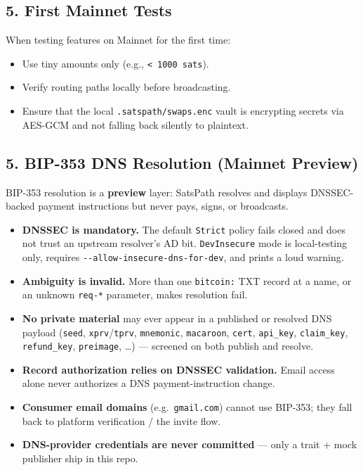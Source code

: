 \documentclass[
]{article}
\providecommand{\tightlist}{%
  \setlength{\itemsep}{0pt}\setlength{\parskip}{0pt}}
\begin{document}
\hypertarget{first-mainnet-tests}{%
\subsection{5. First Mainnet Tests}\label{first-mainnet-tests}}

When testing features on Mainnet for the first time:

\begin{itemize}
\tightlist
\item
  Use tiny amounts only (e.g., \texttt{\textless{}\ 1000\ sats}).
\item
  Verify routing paths locally before broadcasting.
\item
  Ensure that the local \texttt{.satspath/swaps.enc} vault is encrypting
  secrets via AES-GCM and not falling back silently to plaintext.
\end{itemize}

\hypertarget{bip-353-dns-resolution-mainnet-preview}{%
\subsection{5. BIP-353 DNS Resolution (Mainnet
Preview)}\label{bip-353-dns-resolution-mainnet-preview}}

BIP-353 resolution is a \textbf{preview} layer: SatsPath resolves and
displays DNSSEC-backed payment instructions but never pays, signs, or
broadcasts.

\begin{itemize}
\tightlist
\item
  \textbf{DNSSEC is mandatory.} The default \texttt{Strict} policy fails
  closed and does not trust an upstream resolver's AD bit.
  \texttt{DevInsecure} mode is local-testing only, requires
  \texttt{-\/-allow-insecure-dns-for-dev}, and prints a loud warning.
\item
  \textbf{Ambiguity is invalid.} More than one \texttt{bitcoin:} TXT
  record at a name, or an unknown \texttt{req-*} parameter, makes
  resolution fail.
\item
  \textbf{No private material} may ever appear in a published or
  resolved DNS payload (\texttt{seed}, \texttt{xprv}/\texttt{tprv},
  \texttt{mnemonic}, \texttt{macaroon}, \texttt{cert},
  \texttt{api\_key}, \texttt{claim\_key}, \texttt{refund\_key},
  \texttt{preimage}, \ldots) --- screened on both publish and resolve.
\item
  \textbf{Record authorization relies on DNSSEC validation.} Email
  access alone never authorizes a DNS payment-instruction change.
\item
  \textbf{Consumer email domains} (e.g.~\texttt{gmail.com}) cannot use
  BIP-353; they fall back to platform verification / the invite flow.
\item
  \textbf{DNS-provider credentials are never committed} --- only a trait
  + mock publisher ship in this repo.
\end{itemize}
\end{document}
